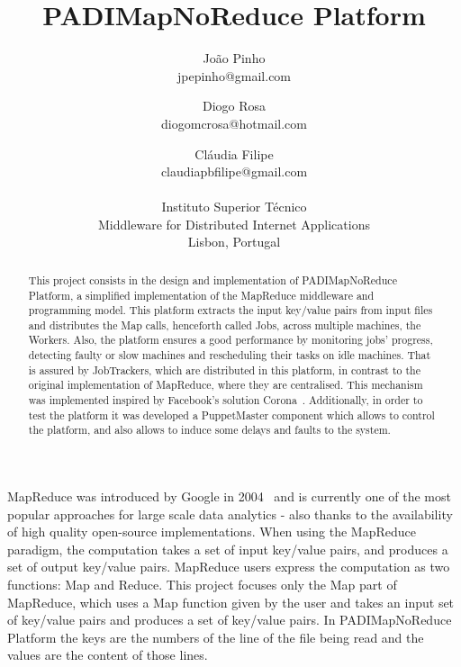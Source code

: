 \documentclass[times, 10pt,twocolumn]{article}
\begin{document}
	
	\title{PADIMapNoReduce Platform}
	
	\author{João Pinho\\jpepinho@gmail.com
		\and Diogo Rosa\\diogomcrosa@hotmail.com
		\and Cláudia Filipe\\claudiapbfilipe@gmail.com\\\\		 
		Instituto Superior Técnico\\ Middleware for Distributed Internet Applications \\ Lisbon, Portugal}
	\maketitle
	\thispagestyle{empty}
	
	\begin{abstract}
		This project consists in the design and implementation of PADIMapNoReduce Platform, a simplified implementation of the MapReduce middleware and programming model. This platform extracts the input key/value pairs from input files and distributes the Map calls, henceforth called Jobs, across multiple machines, the Workers. Also, the platform ensures a good performance by monitoring jobs’ progress, detecting faulty or slow machines and rescheduling their tasks on idle machines. That is assured by JobTrackers, which are distributed in this platform, in contrast to the original implementation of MapReduce, where they are centralised. This mechanism was implemented inspired by Facebook's solution Corona~\cite{ex1}. Additionally, in order to test the platform it was developed a PuppetMaster component which allows to control the platform, and also allows to induce some delays and faults to the system.
		
	\end{abstract}
	MapReduce was introduced by Google in 2004~\cite{ex2} and is currently one of the most popular approaches for
	large scale data analytics - also thanks to the availability of high quality open-source implementations. When using the MapReduce paradigm, the computation takes a set of input key/value
	pairs, and produces a set of output key/value pairs. MapReduce users express the computation as two functions: Map and Reduce. 
	This project focuses only the Map part of MapReduce, which uses a Map function given by the user and takes an input set of key/value pairs and produces a set of key/value pairs. In PADIMapNoReduce Platform the keys are the numbers of the line of the file being read and the values are the content of those lines.
	
\end{document}
